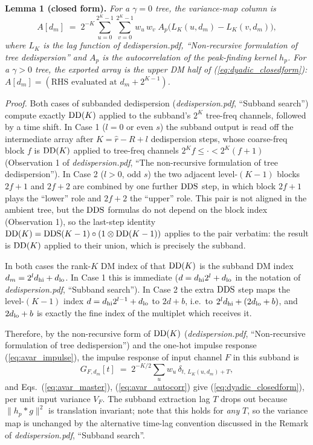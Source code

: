 \documentclass{article}
\numberwithin{equation}{section}   %
\def\DDS{{\rm DDS}}
\def\DD{{\rm DD}}
\newcommand{\ddnotes}[1]{{\em dedispersion.pdf}, ``#1''}
\begin{document}
\medskip
\par\noindent
{\bf Lemma 1 (closed form).}
{\em For a $\gamma=0$ tree, the variance-map column is}
\begin{equation}
A[d_m] \;=\; 2^{-K} \sum_{u=0}^{2^K-1} \sum_{v=0}^{2^K-1}
   w_u \, w_v \; A_p\big( L_K(u,d_m) - L_K(v,d_m) \big),
\label{eq:dyadic_closedform}
\end{equation}
{\em where $L_K$ is the lag function of \ddnotes{Non-recursive formulation of tree dedispersion}
and $A_p$ is the autocorrelation of the
peak-finding kernel $h_p$. For a $\gamma>0$ tree, the exported array is the upper DM half of
(\ref{eq:dyadic_closedform}): $A[d_m] = (\mbox{RHS evaluated at } d_m + 2^{K-1})$.}

\medskip
\par\noindent
{\em Proof.} Both cases of subbanded dedispersion (\ddnotes{Subband search}) compute
exactly $\DD(K)$ applied to the subband's $2^K$ tree-freq channels, followed by a time shift.
In Case 1 ($l=0$ or even $s$) the subband output is read off the intermediate array after
$K = \hat r - R + l$ dedispersion steps, whose coarse-freq block $f$ is $\DD(K)$ applied to
tree-freq channels $2^K f \le \cdot < 2^K (f+1)$ (Observation 1 of
\ddnotes{The non-recursive formulation of tree dedispersion}). In Case 2 ($l>0$, odd $s$) the two adjacent level-$(K-1)$
blocks $2f+1$ and $2f+2$ are combined by one further $\DDS$ step, in which block $2f+1$ plays
the ``lower'' role and $2f+2$ the ``upper'' role. This pair is not aligned in the ambient
tree, but the $\DDS$ formulas do not depend on the block index (Observation 1), so
the last-step identity $\DD(K) = \DDS(K-1) \circ (1 \otimes \DD(K-1))$ applies to the pair
verbatim: the result is $\DD(K)$ applied to
their union, which is precisely the subband.

In both cases the rank-$K$ DM index of that $\DD(K)$ is the subband DM index
$d_m = 2^l d_{\rm hi} + d_{\rm lo}$. In Case 1 this is immediate ($d = d_{\rm hi}2^l +
d_{\rm lo}$ in the notation of \ddnotes{Subband search}). In Case 2 the extra $\DDS$ step
maps the level-$(K-1)$ index $d = d_{\rm hi}2^{l-1} + d_{\rm lo}$ to $2d + b$, i.e.\ to
$2^l d_{\rm hi} + (2 d_{\rm lo} + b)$, and $2d_{\rm lo}+b$ is exactly the fine index of the
multiplet which receives it.

Therefore, by the non-recursive form of $\DD(K)$ (\ddnotes{Non-recursive formulation of tree
dedispersion}) and the one-hot
impulse response (\ref{eq:avar_impulse}), the impulse response of input channel $F$ in this
subband is
\begin{equation}
G_{F,d_m}[t] \;=\; 2^{-K/2} \sum_u w_u \, \delta_{t,\, L_K(u,d_m) + T},
\label{eq:dyadic_impulse}
\end{equation}
and Eqs.\ (\ref{eq:avar_master}), (\ref{eq:avar_autocorr}) give (\ref{eq:dyadic_closedform}),
per unit input variance $V_F$. The subband extraction lag $T$ drops out because
$\|h_p * g\|^2$ is translation invariant; note that this holds for {\em any} $T$, so the
variance map is unchanged by the alternative time-lag convention discussed in the Remark of
\ddnotes{Subband search}.
\end{document}
